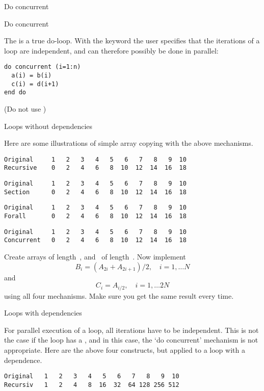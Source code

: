  {Do concurrent}

\begin{block}{Do concurrent}
  \label{sl:farray-concurrent}

  The  is a true do-loop. With the
   keyword the user specifies that the
  iterations of a loop are independent, and can therefore possibly be
  done in parallel:
\begin{lstlisting}
do concurrent (i=1:n)
  a(i) = b(i)
  c(i) = d(i+1)
end do
\end{lstlisting}
(Do not use )
\end{block}

 {Loops without dependencies}

Here are some illustrations of simple array copying with the above
mechanisms.

\begin{lstlisting}
Original     1   2   3   4   5   6   7   8   9  10
Recursive    0   2   4   6   8  10  12  14  16  18
\end{lstlisting}

\begin{lstlisting}
Original     1   2   3   4   5   6   7   8   9  10
Section      0   2   4   6   8  10  12  14  16  18
\end{lstlisting}

\begin{lstlisting}
Original     1   2   3   4   5   6   7   8   9  10
Forall       0   2   4   6   8  10  12  14  16  18
\end{lstlisting}

\begin{lstlisting}
Original     1   2   3   4   5   6   7   8   9  10
Concurrent   0   2   4   6   8  10  12  14  16  18
\end{lstlisting}

\begin{exercise}
  Create arrays  of length~, and ~of length~.
  Now implement
  \[ B_i = (A_{2i}+A_{2i+1})/2,\quad i=1,\ldots N \]
  and
  \[ C_i = A_{i/2},\quad i=1,\ldots 2N \]
  using all four mechanisms. Make sure you get the same result every time.
\end{exercise}

 {Loops with dependencies}

For parallel execution of a loop, all iterations have to be independent.
This is not the case if the loop has a , and in
this case, the `do concurrent' mechanism is not appropriate.
%
Here are the above four constructs, but applied to a loop with a dependence.
%
%
\begin{lstlisting}
Original   1   2   3   4   5   6   7   8   9  10
Recursiv   1   2   4   8  16  32  64 128 256 512
\end{lstlisting}

